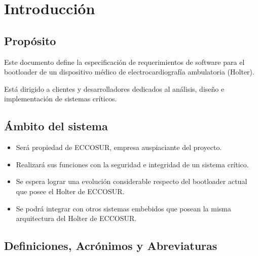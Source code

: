 \documentclass[12pt,a4paper]{article}
\begin{document}
\newpage

\section{Introducción}
\label{sec:introduction}


\subsection{Propósito}
\label{sec:purpose}

Este documento define la especificación de requerimientos de software para el bootloader de un dispositivo médico de 
electrocardiografía ambulatoria (Holter).

Está dirigido a clientes y desarrolladores dedicados al análisis, diseño e implementación de sistemas críticos.


\subsection{Ámbito del sistema}
\label{sec:scope}

\begin{itemize}
	\item Será propiedad de ECCOSUR, empresa auspiaciante del proyecto.

	\item Realizará sus funciones con la seguridad e integridad de un sistema crítico.

	\item Se espera lograr una evolución considerable respecto del bootloader actual que posee el Holter de ECCOSUR.
	
	\item Se podrá integrar con otros sistemas embebidos que posean la misma arquitectura del Holter de ECCOSUR.
\end{itemize}


\subsection{Definiciones, Acrónimos y Abreviaturas}
\label{sec:glossary}
\end{document}
